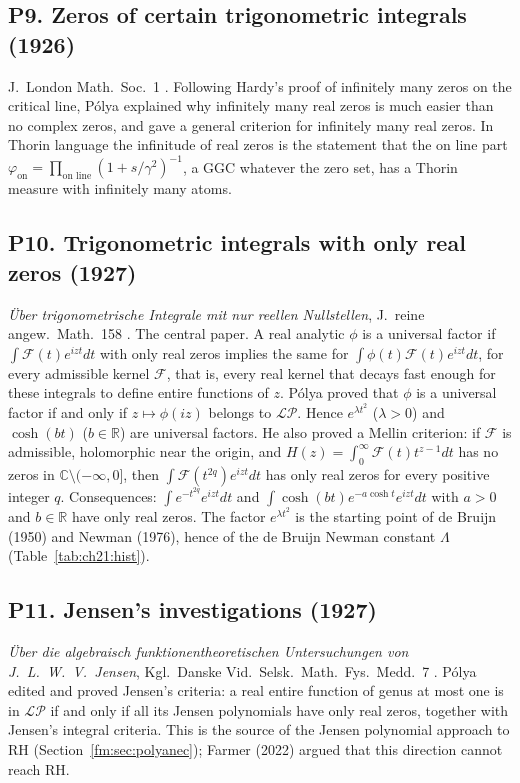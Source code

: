 \subsection*{P9. Zeros of certain trigonometric integrals (1926)}
J.\ London Math.\ Soc.\ 1 \cite{Polya26jlms}. Following Hardy's proof of infinitely many zeros on the critical line, P\'olya explained why infinitely many real zeros is much easier than no complex zeros, and gave a general criterion for infinitely many real zeros. In Thorin language the infinitude of real zeros is the statement that the on line part $\varphi_{\mathrm{on}}=\prod_{\text{on line}}(1+s/\gamma^2)^{-1}$, a GGC whatever the zero set, has a Thorin measure with infinitely many atoms.

\subsection*{P10. Trigonometric integrals with only real zeros (1927)}
\emph{\"Uber trigonometrische Integrale mit nur reellen Nullstellen}, J.\ reine angew.\ Math.\ 158 \cite{Polya27}. The central paper. A real analytic $\phi$ is a universal factor if $\int\mathcal F(t)e^{izt}dt$ with only real zeros implies the same for $\int\phi(t)\mathcal F(t)e^{izt}dt$, for every admissible kernel $\mathcal F$, that is, every real kernel that decays fast enough for these integrals to define entire functions of $z$. P\'olya proved that $\phi$ is a universal factor if and only if $z\mapsto\phi(iz)$ belongs to $\mathcal{LP}$. Hence $e^{\lambda t^2}$ ($\lambda>0$) and $\cosh(bt)$ ($b\in\mathbb R$) are universal factors. He also proved a Mellin criterion: if $\mathcal F$ is admissible, holomorphic near the origin, and $H(z)=\int_0^\infty\mathcal F(t)t^{z-1}dt$ has no zeros in $\mathbb C\setminus(-\infty,0]$, then $\int\mathcal F(t^{2q})e^{izt}dt$ has only real zeros for every positive integer $q$. Consequences: $\int e^{-t^{2q}}e^{izt}dt$ and $\int\cosh(bt)e^{-a\cosh t}e^{izt}dt$ with $a>0$ and $b\in\mathbb R$ have only real zeros. The factor $e^{\lambda t^2}$ is the starting point of de Bruijn (1950) and Newman (1976), hence of the de Bruijn Newman constant $\Lambda$ (Table~\ref{tab:ch21:hist}).

\subsection*{P11. Jensen's investigations (1927)}
\emph{\"Uber die algebraisch funktionentheoretischen Untersuchungen von J.\ L.\ W.\ V.\ Jensen}, Kgl.\ Danske Vid.\ Selsk.\ Math.\ Fys.\ Medd.\ 7 \cite{Polya27j}. P\'olya edited and proved Jensen's criteria: a real entire function of genus at most one is in $\mathcal{LP}$ if and only if all its Jensen polynomials have only real zeros, together with Jensen's integral criteria. This is the source of the Jensen polynomial approach to RH (Section~\ref{fm:sec:polyanec}); Farmer (2022) \cite{Farmer22} argued that this direction cannot reach RH.

